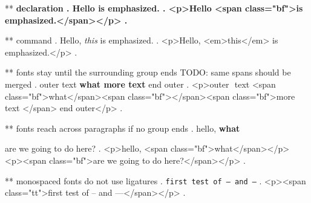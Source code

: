 ** \bfseries declaration
.
Hello \bfseries is emphasized.
.
<p>Hello <span class="bf">is emphasized.</span></p>
.

** \emph{} command
.
Hello, \emph{this} is emphasized.
.
<p>Hello, <em>this</em> is emphasized.</p>
.


** fonts stay until the surrounding group ends      TODO: same spans should be merged
.
outer { text \bfseries {what} more text } end outer
.
<p>outer ​ text <span class="bf">what</span><span class="bf">​ </span><span class="bf">more text </span>​ end outer</p>
.


** fonts reach across paragraphs if no group ends
.
hello, \bfseries what

are we going to do here?
.
<p>hello, <span class="bf">what</span></p>
<p><span class="bf">are we going to do here?</span></p>
.


** monospaced fonts do not use ligatures
.
\texttt{first test of -- and ---}
.
<p><span class="tt">first test of -- and ---</span></p>
.
